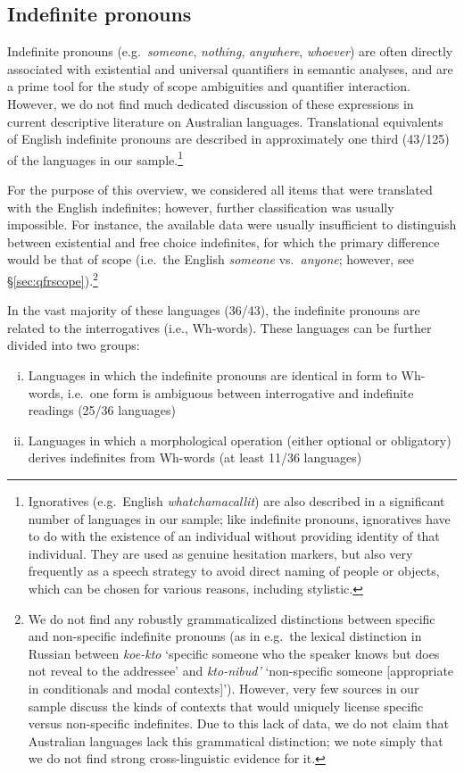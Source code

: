 \documentclass[12pt,egregdoesnotlikesansseriftitles]{scrartcl}
\newcommand{\ofy}{/125} %
\begin{document}
\subsection{Indefinite pronouns}
\label{sec:indefs}
Indefinite pronouns (e.g.\ \textit{someone}, \textit{nothing}, \textit{anywhere}, \textit{whoever}) are often directly associated with existential and universal quantifiers in semantic analyses, and are a prime tool for the study of scope ambiguities and quantifier interaction. However, we do not find much dedicated discussion of these expressions in current descriptive literature on Australian languages. Translational equivalents of English indefinite pronouns  are described in approximately one third (43\ofy) of the languages in our sample.\footnote{Ignoratives (e.g.\ English \textit{whatchamacallit}) are also described in a significant number of languages in our sample; like indefinite pronouns, ignoratives have to do with the existence of an individual without providing identity of that individual. They are used as genuine hesitation markers, but also very frequently as a speech strategy to avoid direct naming of people or objects, which can be chosen for various reasons, including stylistic.}

For the purpose of this overview, we considered all items that were translated with the English indefinites; however, further classification was usually impossible. For instance, the available data were usually insufficient to distinguish between existential and free choice indefinites, for which the primary difference would be that of scope (i.e.\ the English \textit{someone} vs.\ \textit{anyone}; however, see \S\ref{sec:qfrscope}).\footnote{We do not find any robustly grammaticalized distinctions between specific and non-specific indefinite pronouns (as in e.g.\ the lexical distinction in Russian between \textit{koe-kto} `specific someone who the speaker knows but does not reveal to the addressee' and \textit{kto-nibud'} `non-specific someone [appropriate in conditionals and modal contexts]'). However, very few sources in our sample discuss the kinds of contexts that would uniquely license specific versus non-specific indefinites. Due to this lack of data, we do not claim that Australian languages lack this grammatical distinction; we note simply that we do not find strong cross-linguistic evidence for it.}

In the vast majority of these languages (36/43), the indefinite pronouns are related to the interrogatives (i.e., Wh-words). These languages can be further divided into two groups:
\begin{enumerate}[(i)]
\item Languages in which the indefinite pronouns are identical in form to Wh-words, i.e.\ one form is ambiguous between interrogative and indefinite readings (25/36 languages) %
\item Languages in which a morphological operation (either optional or obligatory) derives indefinites from Wh-words (at least 11/36 languages)
\end{enumerate}
\end{document}
